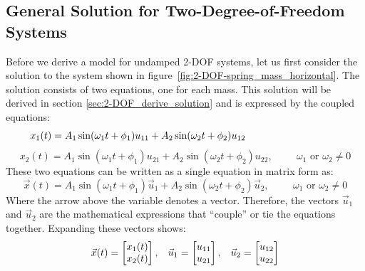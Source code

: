 \documentclass[12pt,letter]{article}
\begin{document}
\subsection{General Solution for Two-Degree-of-Freedom Systems}
Before we derive a model for undamped 2-DOF systems, let us first consider the solution to the system shown in figure~\ref{fig:2-DOF-spring_mass_horizontal}. The solution consists of two equations, one for each mass. This solution will be derived in section \ref{sec:2-DOF_derive_solution} and is expressed by the coupled equations:
\begin{equation}
 x_1(t) = A_1 \sin (\omega_1 t + \phi_1 )u_{11}+ A_2 \sin (\omega_2 t + \phi_2 )u_{12} \hspace{3.35cm} 
\end{equation}
\begin{equation}
 x_2(t) = A_1 \sin (\omega_1 t + \phi_1 )u_{21}+ A_2 \sin (\omega_2 t + \phi_2 )u_{22} , \hspace{1cm} \omega_1 \text{ or } \omega_2 \neq 0 \nonumber
\end{equation}
These two equations can be written as a single equation in matrix form as:
\begin{equation}
 \vec{x}(t) = A_1 \sin (\omega_1 t + \phi_1 )\vec{u}_1 + A_2 \sin (\omega_2 t + \phi_2 )\vec{u}_2 , \hspace{1cm} \omega_1 \text{ or } \omega_2 \neq 0
 \label{eq:2-DOF_solution}
\end{equation}
Where the arrow above the variable denotes a vector. Therefore, the vectors $\vec{u}_1$ and $\vec{u}_2$ are the mathematical expressions that ``couple'' or tie the equations together. Expanding these vectors shows: 
\begin{eqnarray}
\vec{x}(t)=  \begin{bmatrix} x_1(t) \\  x_2(t) \end{bmatrix}, \hspace{2ex} \vec{u}_1=  \begin{bmatrix} u_{11} \\  u_{21} \end{bmatrix}, \hspace{2ex} \vec{u}_2=  \begin{bmatrix} u_{12} \\  u_{22} \end{bmatrix}
\end{eqnarray}

\pagebreak
\end{document}
